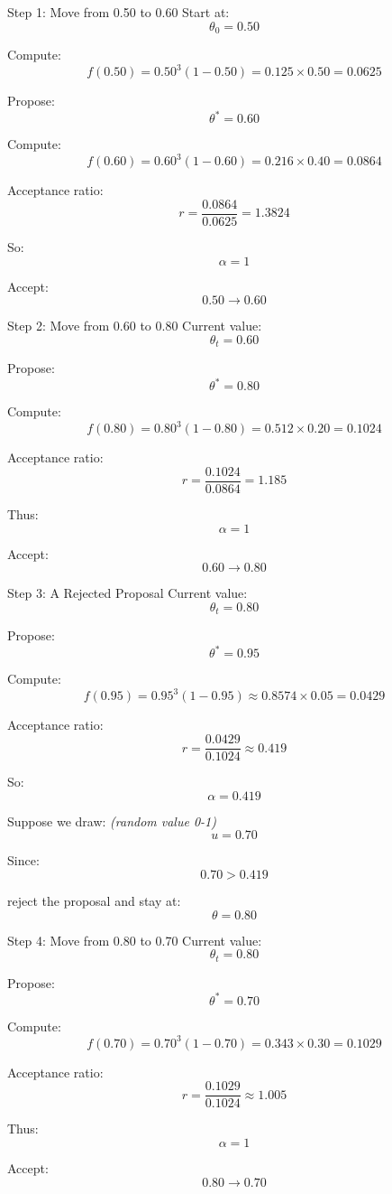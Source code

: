 \documentclass[aspectratio=43,11pt]{beamer}
\begin{document}
\begin{frame}{Step 1: Move from 0.50 to 0.60}
Start at:
\[
\theta_0 = 0.50
\]

Compute:
\[
 f(0.50)=0.50^3(1-0.50)=0.125 \times 0.50=0.0625
\]

Propose:
\[
\theta^*=0.60
\]

Compute:
\[
 f(0.60)=0.60^3(1-0.60)=0.216 \times 0.40=0.0864
\]

Acceptance ratio:
\[
 r=\frac{0.0864}{0.0625}=1.3824
\]

So:
\[
\alpha=1
\]

Accept:
\[
0.50 \rightarrow 0.60
\]
\end{frame}

\begin{frame}{Step 2: Move from 0.60 to 0.80}
Current value:
\[
\theta_t=0.60
\]

Propose:
\[
\theta^*=0.80
\]

Compute:
\[
 f(0.80)=0.80^3(1-0.80)=0.512 \times 0.20=0.1024
\]

Acceptance ratio:
\[
 r=\frac{0.1024}{0.0864}=1.185
\]

Thus:
\[
\alpha=1
\]

Accept:
\[
0.60 \rightarrow 0.80
\]
\end{frame}

\begin{frame}{Step 3: A Rejected Proposal}
\small
Current value:
\[
\theta_t=0.80
\]

Propose:
\[
\theta^*=0.95
\]

Compute:
\[
 f(0.95)=0.95^3(1-0.95)\approx 0.8574\times 0.05=0.0429
\]

Acceptance ratio:
\[
 r=\frac{0.0429}{0.1024}\approx 0.419
\]

So:
\[
\alpha=0.419
\]

Suppose we draw: {\tiny \it(random value 0-1)} %
\[
u=0.70
\]

Since:
\[
0.70>0.419
\]

reject the proposal and stay at:
\[
\theta=0.80
\]
\end{frame}

\begin{frame}{Step 4: Move from 0.80 to 0.70}
Current value:
\[
\theta_t=0.80
\]

Propose:
\[
\theta^*=0.70
\]

Compute:
\[
 f(0.70)=0.70^3(1-0.70)=0.343 \times 0.30=0.1029
\]

Acceptance ratio:
\[
 r=\frac{0.1029}{0.1024}\approx1.005
\]

Thus:
\[
\alpha=1
\]

Accept:
\[
0.80 \rightarrow 0.70
\]
\end{frame}
\end{document}
